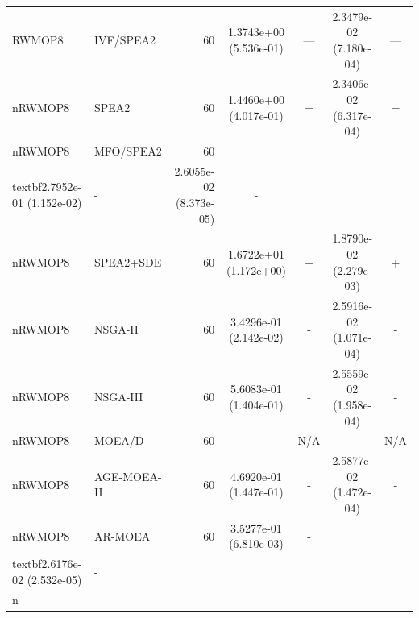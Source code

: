 \begin{table}[t]
{\begin{tabular}{llrcccc}
RWMOP8 & IVF/SPEA2 & 60 & 1.3743e+00 (5.536e-01) & --- & 2.3479e-02 (7.180e-04) & --- \\nRWMOP8 & SPEA2 & 60 & 1.4460e+00 (4.017e-01) & = & 2.3406e-02 (6.317e-04) & = \\nRWMOP8 & MFO/SPEA2 & 60 & \\textbf{2.7952e-01 (1.152e-02)} & - & 2.6055e-02 (8.373e-05) & - \\nRWMOP8 & SPEA2+SDE & 60 & 1.6722e+01 (1.172e+00) & + & 1.8790e-02 (2.279e-03) & + \\nRWMOP8 & NSGA-II & 60 & 3.4296e-01 (2.142e-02) & - & 2.5916e-02 (1.071e-04) & - \\nRWMOP8 & NSGA-III & 60 & 5.6083e-01 (1.404e-01) & - & 2.5559e-02 (1.958e-04) & - \\nRWMOP8 & MOEA/D & 60 & --- & N/A & --- & N/A \\nRWMOP8 & AGE-MOEA-II & 60 & 4.6920e-01 (1.447e-01) & - & 2.5877e-02 (1.472e-04) & - \\nRWMOP8 & AR-MOEA & 60 & 3.5277e-01 (6.810e-03) & - & \\textbf{2.6176e-02 (2.532e-05)} & - \\n\botrule
\end{tabular}
}
\end{table}
